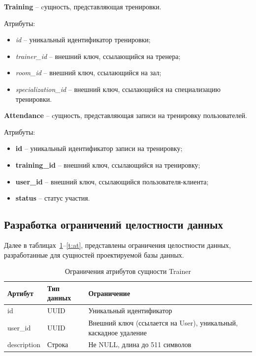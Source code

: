 \textbf{Training} -- cущность, представляющая тренировки.

Атрибуты:
\begin{itemize} 
	\item \textit{id} -- уникальный идентификатор тренировки; 
	\item \textit{trainer\_id} -- внешний ключ, ссылающийся на тренера;
	\item \textit{room\_id} -- внешний ключ, ссылающийся на зал;
	\item \textit{specialization\_id} -- внешний ключ, ссылающийся на специализацию тренировки.
\end{itemize}

\textbf{Attendance} -- cущность, представляющая записи на тренировку пользователей.

Атрибуты:
\begin{itemize} 
	\item \textbf{id} -- уникальный идентификатор записи на тренировку;
	\item \textbf{training\_id} -- внешний ключ, ссылающийся на тренировку;
	\item \textbf{user\_id} -- внешний ключ, ссылающийся пользователя-клиента; 
	\item \textbf{status} -- статус участия.
\end{itemize}

\subsection{Разработка ограничений целостности данных}

Далее в таблицах~\ref{t:ur}--\ref{t:at}, представлены ограничения целостности данных, разработанные для сущностей проектируемой базы данных.

\begin{table}[H]
	\centering
	\begin{tabular}{|p{3.5cm}|p{3.5cm}|p{8.5cm}|}
		\hline
		\textbf{Артибут}             & \textbf{Тип данных}   & \textbf{Ограничение}             \\ \hline
		id                            & UUID                 & Уникальный идентификатор         \\ \hline
		user\_id                      & UUID                 & Внешний ключ (ссылается на User), уникальный, каскадное удаление \\ \hline
		description                   & Строка                  & Не NULL, длина до 511 символов   \\ \hline
	\end{tabular}
	\caption{Ограничения атрибутов сущности Trainer}\label{t:ur}
\end{table}

